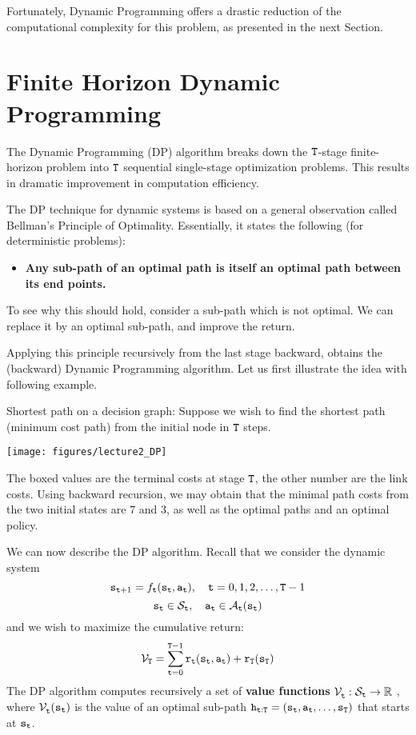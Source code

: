 Fortunately, Dynamic Programming offers a drastic reduction of the
computational complexity for this problem, as presented in the next Section.

\section{Finite Horizon Dynamic Programming}

The Dynamic Programming (DP) algorithm breaks down the
${\tt T}$-stage finite-horizon problem into ${\tt T}$ sequential
single-stage optimization problems. This results in dramatic
improvement in computation efficiency.

The DP technique for dynamic systems is based on a general
observation called Bellman's Principle of Optimality. Essentially, it
states the following (for deterministic problems):
\begin{itemize}
  \item \textbf{Any sub-path of an optimal path is itself an optimal path between its end points.}
\end{itemize}
To see why this should hold, consider a sub-path which is not
optimal. We can replace it by an optimal sub-path, and improve the
return.

Applying this principle recursively from the last stage backward,
obtains the (backward) Dynamic Programming algorithm. Let us first
illustrate the idea with following example.

\begin{example}
Shortest path on a decision graph:  Suppose we wish to find the
shortest path (minimum cost path) from the initial node in
${\tt T}$ steps.

\begin{centering}
\texttt{[image: figures/lecture2\_DP]}
\end{centering}

\medskip
The boxed values are the terminal costs at stage ${\tt T}$, the
other number are the link costs. Using backward recursion, we may
obtain that the minimal path costs from the two initial states are
$7$ and $3$, as well as the optimal paths and an optimal policy.
\end{example}

We can now describe the DP algorithm. Recall that we consider the dynamic system
$${{\tt s}_{{\tt t} + 1}} = {f_{{\tt t}}}({{\tt s}_{{\tt t}}},{{\tt a}_{{\tt t}}}),\quad {\tt t} = 0,1,2, \ldots ,{\tt T} - 1$$
$${{\tt s}_{{\tt t}}} \in {\mathcal{S}_{{\tt t}}},\quad {{\tt a}_{{\tt t}}} \in {\mathcal{A}_{{\tt t}}}({{\tt s}_{{\tt t}}})$$
and we wish to maximize the cumulative return:
$${\mathcal{V}_{\tt T}} = \sum_{{\tt t} = 0}^{{\tt T} - 1} {{{\tt r}_{{\tt t}}}({{\tt s}_{{\tt t}}},{{\tt a}_{{\tt t}}}) + {{\tt r}_{\tt T}}({{\tt s}_{\tt T}})} $$
The DP algorithm computes recursively a set of \textbf{value
functions} $\mathcal{V}_{{\tt t}}^{}:{\mathcal{S}_{{\tt t}}} \to \mathbb{R}$ , where
$\mathcal{V}_{{\tt t}}^{}({{\tt s}_{{\tt t}}})$ is the value of an optimal
sub-path ${{\tt h}_{{\tt t}:{\tt T}}} =
({{\tt s}_{{\tt t}}},{{\tt a}_{{\tt t}}}, \ldots ,{{\tt s}_{\tt T}})$
that starts at ${{\tt s}_{{\tt t}}}$.


